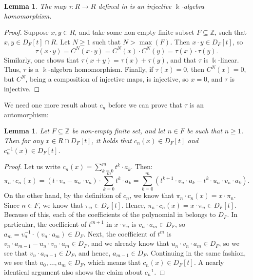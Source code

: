 \documentclass{amsart}
\newtheorem{lem}[equation]{Lemma}
\theoremstyle{definition}
\renewcommand{\k}{\Bbbk}
\numberwithin{equation}{section}
\begin{document}
\begin{lem}\label{lem:tauinjective}
The map $\tau:R \to R$ defined in  is an injective $\k$-algebra homomorphism.
\end{lem}
\begin{proof}
Suppose $x,y \in R$,
and take some non-empty finite subset $F \subseteq \mathbb{Z}$, such that $x,y \in D_F[t] \cap R$. Let $N \ge 1$ such that $N > \max(F)$.
Then $x\cdot y \in D_F[t]$,
so
\[
\tau(x\cdot y) = C^N(x \cdot y) = C^N(x) \cdot C^N(y) = \tau(x) \cdot \tau(y).
\]
Similarly, one shows that $\tau(x+y) = \tau(x) + \tau(y)$,
and that $\tau$ is $\k$-linear. Thus, $\tau$ is a $\k$-algebra homomorphism.
Finally, if $\tau(x) = 0$,
then $C^N(x) = 0$, but $C^N$, being a composition of injective maps,
is injective, so $x = 0$, and $\tau$ is injective.
\end{proof}

We need one more result about $c_n$ before we can prove that $\tau$ is an automorphism:

\begin{lem}\label{lem:cnDFinDF}
Let $F \subseteq \mathbb{Z}$ be non-empty finite set,
and let $n \in F$ be such that $n \ge 1$.
Then for any $x \in R\cap D_F[t]$,
it holds that $c_n(x) \in D_F[t]$ and $c_n^{-1}(x) \in D_F[t]$.
\end{lem}
\begin{proof}
Let us write $c_n(x) = \sum_{k=0}^m t^k \cdot a_k$.
Then:
\begin{equation}\label{eqn:pincnforcoeff}
\pi_n \cdot c_n(x) = (t\cdot v_n -u_n\cdot v_n) \cdot \sum_{k=0}^m t^k \cdot a_k = 
\sum_{k=0}^m (t^{k+1} \cdot v_n \cdot a_k - t^k \cdot u_n \cdot v_n \cdot a_k).
\end{equation}
On the other hand, by the definition of $c_n$,
we know that $\pi_n \cdot c_n(x) = x\cdot \pi_n$.
Since $n \in F$, we know that $\pi_n \in D_F[t]$.
Hence, $\pi_n \cdot c_n(x) = x\cdot \pi_n \in D_F[t]$.
Because of this, each of the coefficients of the polynomial in  belongs to $D_F$.
In particular, the coefficient of $t^{m+1}$ in $x\cdot \pi_n$ is $v_n \cdot a_m \in D_F$,
so $a_m = v_n^{-1} \cdot (v_n \cdot a_m) \in D_F$.
Next, the coefficient of $t^m$ is $v_n\cdot a_{m-1} - u_n\cdot v_n \cdot a_m \in D_F$,
and we already know that $u_n\cdot v_n \cdot a_m \in D_F$, so we see that $v_n \cdot a_{m-1} \in D_F$, and hence, $a_{m-1} \in D_F$. Continuing in the same fashion,
we see that $a_0 ,\dots, a_m \in D_F$, which means that $c_n(x) \in D_F[t]$.
A nearly identical argument also shows the claim about $c_n^{-1}$.
\end{proof}
\end{document}
